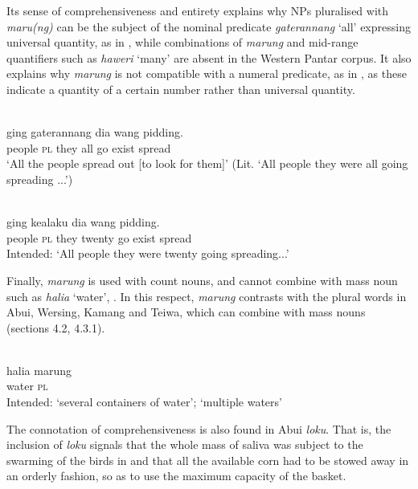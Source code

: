 Its sense of comprehensiveness and entirety explains why NPs pluralised with \textit{maru(ng)} can be the subject of the nominal predicate \textit{gaterannang} `all' expressing universal quantity, as in , while combinations of \textit{marung} and mid-range quantifiers such as \textit{haweri} `many' are absent in the Western Pantar corpus. It also explains why \textit{marung} is not compatible with a numeral predicate, as in , as these indicate a quantity of a certain number rather than universal quantity.


\ea%
\label{ex:9:66}
 \\
 ging gaterannang dia wang pidding. \\
   people \textsc{pl} they all  go exist spread  \\
\glt `All the people spread out [to look for them]' \citep{Holton2012}
(Lit. `All people they were all going spreading ...')
\z








\ea%
\label{ex:9:67}
 \\
 ging kealaku dia wang pidding. \\
    people \textsc{pl} they twenty go exist spread \\
 \glt Intended: `All people they were twenty going spreading...'
\z






Finally, \textit{marung} is used with count nouns, and cannot combine with mass noun such as \textit{halia} `water', . In this respect, \textit{marung} contrasts with the plural words in Abui, Wersing, Kamang and Teiwa, which can combine with mass nouns (sections 4.2,  4.3.1).


\ea%
\label{ex:9:68}
 \\
\gll  *halia marung \\
   water \textsc{pl}  \\
\glt Intended: `several containers of water';  `multiple waters'
\z






The connotation of comprehensiveness is also found in Abui \textit{loku}. That is, the inclusion of \textit{loku} signals that the whole mass of saliva was subject to the swarming of the birds in  and that all the available corn had to be stowed away  in an orderly fashion, so as to use the maximum capacity of the basket.


